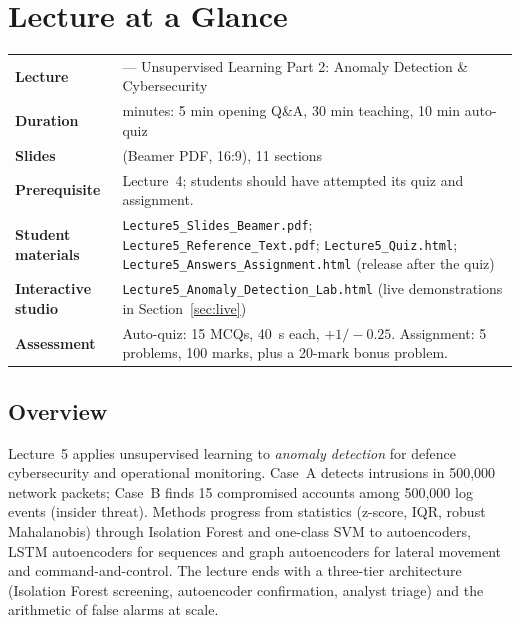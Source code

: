 \documentclass[11pt]{article}
\begin{document}
\section{Lecture at a Glance}

\begin{center}\small\renewcommand{\arraystretch}{1.25}\begin{tabularx}{\textwidth}{@{}>{\bfseries}p{3.3cm}>{\raggedright\arraybackslash}X@{}}\toprule

\textcolor{NavyN}{Lecture}&5 --- Unsupervised Learning Part 2: Anomaly Detection \& Cybersecurity\\
\textcolor{NavyN}{Duration}&45 minutes: 5 min opening Q\&A, 30 min teaching, 10 min auto-quiz\\
\textcolor{NavyN}{Slides}&23 (Beamer PDF, 16:9), 11 sections\\
\textcolor{NavyN}{Prerequisite}&Lecture~4; students should have attempted its quiz and assignment.\\
\textcolor{NavyN}{Student materials}&\texttt{Lecture5\_Slides\_Beamer.pdf}; \texttt{Lecture5\_Reference\_Text.pdf}; \texttt{Lecture5\_Quiz.html}; \texttt{Lecture5\_Answers\_Assignment.html} (release after the quiz)\\
\textcolor{NavyN}{Interactive studio}&\texttt{Lecture5\_Anomaly\_Detection\_Lab.html} (live demonstrations in Section~\ref{sec:live})\\
\textcolor{NavyN}{Assessment}&Auto-quiz: 15 MCQs, 40~s each, $+1/-0.25$. Assignment: 5 problems, 100 marks, plus a 20-mark bonus problem.\\\bottomrule\end{tabularx}\end{center}

\subsection*{Overview}Lecture~5 applies unsupervised learning to \emph{anomaly detection} for defence cybersecurity and operational monitoring. Case~A detects intrusions in 500,000 network packets; Case~B finds 15 compromised accounts among 500,000 log events (insider threat). Methods progress from statistics (z-score, IQR, robust Mahalanobis) through Isolation Forest and one-class SVM to autoencoders, LSTM autoencoders for sequences and graph autoencoders for lateral movement and command-and-control. The lecture ends with a three-tier architecture (Isolation Forest screening, autoencoder confirmation, analyst triage) and the arithmetic of false alarms at scale.
\end{document}
